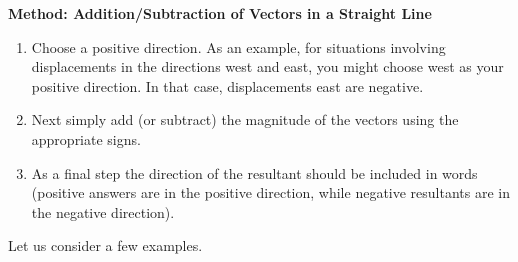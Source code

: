 \begin{minipage}{\textwidth}
\textbf{Method: Addition/Subtraction of Vectors in a Straight Line}
\begin{enumerate}[noitemsep, label=\textbf{\arabic*}.]
\item{Choose a positive direction. As an example, for
situations involving displacements in the directions west and east, you
might choose west as your positive direction. In that case,
displacements east are negative.}
\item{Next simply add (or subtract) the
magnitude of the vectors using the appropriate signs.}
\item{As a final step the direction of the resultant should be included in
words (positive answers are in the positive direction, while negative
resultants are in the negative direction).}\\
\end{enumerate}
\end{minipage}

Let us consider a few examples. 

